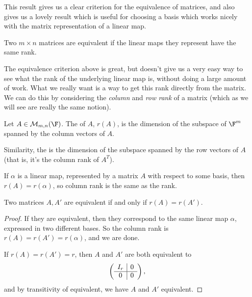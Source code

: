 \documentclass[a4paper]{scrartcl}
\begin{document}
This result gives us a clear criterion for the equivalence of matrices, and also gives us a lovely result which is useful for choosing a basis which works nicely with the matrix representation of a linear map.

\begin{corollary}
    Two $m \times n$ matrices are equivalent if the linear maps they represent have the same rank.
\end{corollary}

The equivalence criterion above is great, but doesn't give us a very easy way to see what the rank of the underlying linear map is, without doing a large amount of work. What we really want is a way to get this rank directly from the matrix. We can do this by considering the \emph{column} and \emph{row rank} of a matrix (which as we will see are really the same notion).

\begin{definition}
    Let $A \in \mathcal{M}_{m, n}(\F)$. The  of $A$, $r(A)$, is the dimension of the subspace of $\F^m$ spanned by the column vectors of $A$.

    Similarity, the  is the dimension of the subspace spanned by the row vectors of $A$ (that is, it's the column rank of $A^T$).
\end{definition}

\begin{remark}
    If $\alpha$ is a linear map, represented by a matrix $A$ with respect to some basis, then $r(A) = r(\alpha)$, so column rank is the same as the rank.
\end{remark}

\begin{proposition}
    Two matrices $A, A'$ are equivalent if and only if $r(A) = r(A')$.
\end{proposition}
\begin{proof}
    If they are equivalent, then they correspond to the same linear map $\alpha$, expressed in two different bases. So the column rank is $r(A) = r(A') = r(\alpha)$, and we are done.

    If $r(A) = r(A') = r$, then $A$ and $A'$ are both equivalent to
    $$
    \left(\begin{array}{ c | c }
        I_r & 0 \\
        \hline
        0 & 0
      \end{array}\right),
      $$
      and by transitivity of equivalent, we have $A$ and $A'$ equivalent.
\end{proof}
\end{document}
